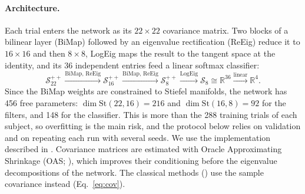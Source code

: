 \paragraph{Architecture.}
Each trial enters the network as its $22 \times 22$ covariance matrix. Two blocks of a bilinear layer (BiMap) followed by an eigenvalue rectification (ReEig) reduce it to $16 \times 16$ and then $8 \times 8$, LogEig maps the result to the tangent space at the identity, and its 36 independent entries feed a linear softmax classifier:
\begin{equation}
  \mathcal{S}^{++}_{22} \xrightarrow{\text{BiMap, ReEig}} \mathcal{S}^{++}_{16}
  \xrightarrow{\text{BiMap, ReEig}} \mathcal{S}^{++}_{8}
  \xrightarrow{\text{LogEig}} \mathcal{S}_{8} \cong \mathbb{R}^{36}
  \xrightarrow{\text{linear}} \mathbb{R}^{4}.
  \label{eq:spdnet}
\end{equation}
Since the BiMap weights are constrained to Stiefel manifolds, the network has 456 free parameters: $\dim \mathrm{St}(22,16) = 216$ and $\dim \mathrm{St}(16,8) = 92$ for the filters, and 148 for the classifier. This is more than the 288 training trials of each subject, so overfitting is the main risk, and the protocol below relies on validation and on repeating each run with several seeds. We use the implementation described in . Covariance matrices are estimated with Oracle Approximating Shrinkage (OAS; \citealp{chen2010}), which improves their conditioning before the eigenvalue decompositions of the network. The classical methods () use the sample covariance instead (Eq.~\ref{eq:cov}).


